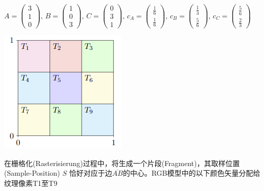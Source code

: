 \documentclass[fleqn]{article}
\begin{document}
$A=\begin{pmatrix}
    3\\1\\0
\end{pmatrix},\,
B=\begin{pmatrix}
    1\\0\\3
\end{pmatrix},\,
C=\begin{pmatrix}
    0\\3\\1
\end{pmatrix},\,
c_A=\begin{pmatrix}
    \frac{1}{6}\\\frac{1}{6}
\end{pmatrix},\,
c_B=\begin{pmatrix}
    \frac{1}{3}\\\frac{5}{6}
\end{pmatrix},\,
c_C=\begin{pmatrix}
    \frac{5}{6}\\\frac{2}{3}
\end{pmatrix}$

\begin{center}
    \includegraphics[scale=0.5]{31.png}
\end{center}

在栅格化(Rasterisierung)过程中，将生成一个片段(Fragment)，其取样位置(Sample-Position) $S$ 恰好对应于边$\overline{AB}$的中心。RGB模型中的以下颜色矢量分配给纹理像素T1至T9
\end{document}

